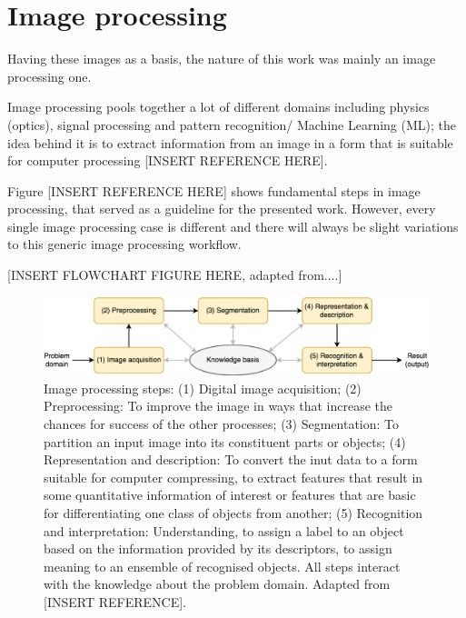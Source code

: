 \section{Image processing}

Having these images as a basis, the nature of this work was mainly an image processing one.

Image processing pools together a lot of different domains including physics (optics), signal processing and pattern recognition/ Machine Learning (ML); %
the idea behind it is to extract information from an image in a form that is suitable for computer processing [INSERT REFERENCE HERE]. 

Figure [INSERT REFERENCE HERE] shows fundamental steps in image processing, that served as a guideline for the presented work. However, every single image processing case is different and there will always be slight variations to this generic image processing workflow.



[INSERT FLOWCHART FIGURE HERE, adapted from....]

\begin{figure}[H]
	\centering
	\includegraphics[width=\textwidth]{../Figures/imageprocessing.png}
	\caption{Image processing steps: (1) Digital image acquisition; (2) Preprocessing: To improve the image in ways that increase the chances for success of the other processes; (3) Segmentation: To partition an input image into its constituent parts or objects; (4) Representation and description: To convert the inut data to a form suitable for computer compressing, to extract features that result in some quantitative information of interest or features that are basic for differentiating one class of objects from another; (5) Recognition and interpretation: Understanding, to assign a label to an object based on the information provided by its descriptors, to assign meaning to an ensemble of recognised objects. All steps interact with the knowledge about the problem domain. 
		Adapted from [INSERT REFERENCE].}
	\label{fig:imageprocessingWorkflow}
\end{figure}



